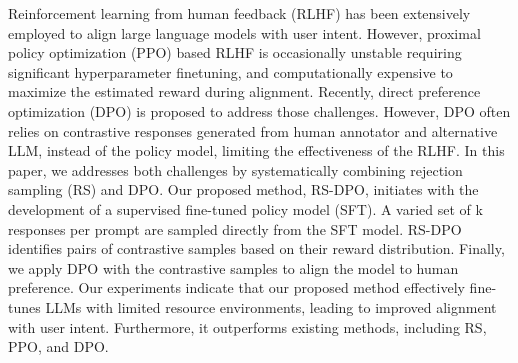 Reinforcement learning from human feedback (RLHF) has been extensively employed to align large language models with user intent. However, proximal policy optimization (PPO) based RLHF is occasionally unstable requiring significant hyperparameter finetuning, and computationally expensive to maximize the estimated reward during alignment. Recently, direct preference optimization (DPO) is proposed to address those challenges. However, DPO often relies on contrastive responses generated from human annotator and alternative LLM, instead of the policy model, limiting the effectiveness of the RLHF. In this paper, we addresses both challenges by systematically combining rejection sampling (RS) and DPO. Our proposed method, RS-DPO, initiates with the development of a supervised fine-tuned policy model (SFT). A varied set of k responses per prompt are sampled directly from the SFT model. RS-DPO identifies pairs of contrastive samples based on their reward distribution. Finally, we apply DPO with the contrastive samples to align the model to human preference. Our experiments indicate that our proposed method effectively fine-tunes LLMs with limited resource environments, leading to improved alignment with user intent. Furthermore, it outperforms existing methods, including RS, PPO, and DPO.
